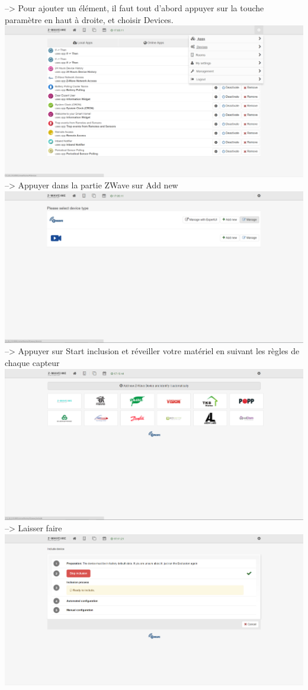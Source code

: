 --> Pour ajouter un élément, il faut tout d'abord appuyer sur la touche paramètre en haut à droite, et choisir Devices.
\includegraphics[scale=0.5]{./Images/png/menu_zwaveme.png}\newline
 --> Appuyer dans la partie ZWave sur Add new
\includegraphics[scale=0.5]{./Images/png/devices_zwaveme.png}\newline
--> Appuyer sur Start inclusion et réveiller votre matériel en suivant les règles de chaque capteur
\includegraphics[scale=0.5]{./Images/png/add_zwaveme.png}\newline
--> Laisser faire
\includegraphics[scale=0.5]{./Images/png/add2_zwaveme.png}\newline
